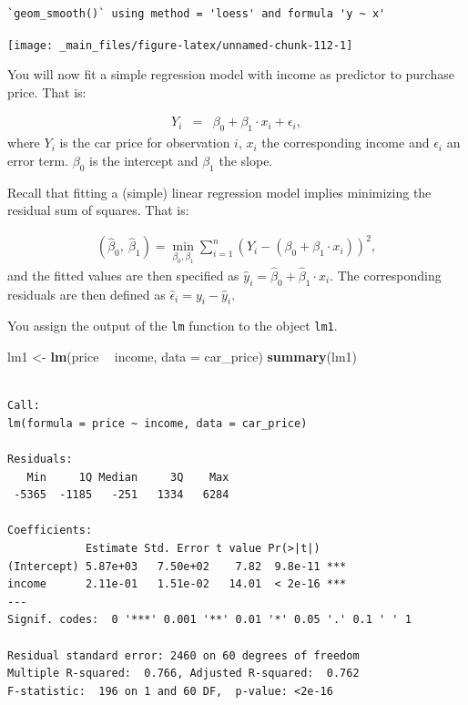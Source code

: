 \documentclass[
]{book}
\newenvironment{Shaded}{\begin{snugshade}}{\end{snugshade}}
\newcommand{\DataTypeTok}[1]{\textcolor[rgb]{0.13,0.29,0.53}{#1}}
\newcommand{\KeywordTok}[1]{\textcolor[rgb]{0.13,0.29,0.53}{\textbf{#1}}}
\newcommand{\NormalTok}[1]{#1}
\newcommand{\OperatorTok}[1]{\textcolor[rgb]{0.81,0.36,0.00}{\textbf{#1}}}
\newcommand{\StringTok}[1]{\textcolor[rgb]{0.31,0.60,0.02}{#1}}
\begin{document}
\begin{verbatim}
`geom_smooth()` using method = 'loess' and formula 'y ~ x'
\end{verbatim}

\begin{center}\texttt{[image: \_main\_files/figure-latex/unnamed-chunk-112-1]} \end{center}

You will now fit a simple regression model with income as predictor to purchase price. That is:

\begin{eqnarray*}
Y_i &=& \beta_0+\beta_1 \cdot x_i +\epsilon_i,
\end{eqnarray*}
where \(Y_i\) is the car price for observation \(i\), \(x_i\) the corresponding income and \(\epsilon_i\) an error term. \(\beta_0\) is the intercept and \(\beta_1\) the slope.

Recall that fitting a (simple) linear regression model implies minimizing the residual sum of squares. That is:

\begin{eqnarray*}
(\hat{\beta}_0,\ \hat{\beta}_1) = \min_{\beta_0, \beta_1} \sum_{i=1}^n \left(Y_i - (\beta_0+\beta_1 \cdot x_{i})\right)^2,
\end{eqnarray*}
and the fitted values are then specified as \(\hat{y}_i=\hat{\beta}_0+\hat{\beta}_1\cdot x_{i}\). The corresponding residuals are then defined as \(\hat{\epsilon}_i = y_i - \hat{y}_i\).

You assign the output of the \texttt{lm} function to the object \texttt{lm1}.

\begin{Shaded}
\begin{Highlighting}[]
\NormalTok{lm1 <-}\StringTok{ }\KeywordTok{lm}\NormalTok{(price }\OperatorTok{~}\StringTok{ }\NormalTok{income, }\DataTypeTok{data =}\NormalTok{ car_price)}
\KeywordTok{summary}\NormalTok{(lm1)}
\end{Highlighting}
\end{Shaded}

\begin{verbatim}

Call:
lm(formula = price ~ income, data = car_price)

Residuals:
   Min     1Q Median     3Q    Max 
 -5365  -1185   -251   1334   6284 

Coefficients:
            Estimate Std. Error t value Pr(>|t|)    
(Intercept) 5.87e+03   7.50e+02    7.82  9.8e-11 ***
income      2.11e-01   1.51e-02   14.01  < 2e-16 ***
---
Signif. codes:  0 '***' 0.001 '**' 0.01 '*' 0.05 '.' 0.1 ' ' 1

Residual standard error: 2460 on 60 degrees of freedom
Multiple R-squared:  0.766,	Adjusted R-squared:  0.762 
F-statistic:  196 on 1 and 60 DF,  p-value: <2e-16
\end{verbatim}
\end{document}
